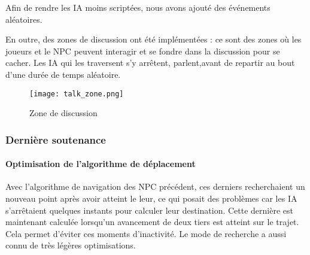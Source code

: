     
        Afin de rendre les IA moins scriptées, nous avons ajouté des événements aléatoires.
        
        En outre, des zones de discussion ont été implémentées : ce sont des zones où les joueurs et le NPC peuvent interagir 
        et se fondre dans la discussion pour se cacher. Les IA qui les traversent s'y arrêtent, parlent,avant de repartir au bout d'une durée 
        de temps aléatoire.

        \begin{figure}[hbt!]
            \centering
            \texttt{[image: talk\_zone.png]}
            \caption{Zone de discussion}
        \end{figure}
        \FloatBarrier


    \vspace{0.5cm}
    \subsubsection{Dernière soutenance}
    \vspace{0.5cm}

        \paragraph{Optimisation de l'algorithme de déplacement}

        Avec l'algorithme de navigation des NPC précédent, ces derniers recherchaient un nouveau point après avoir atteint 
        le leur, ce qui posait des problèmes car les IA s'arrêtaient quelques instants pour calculer leur destination. Cette dernière 
        est maintenant calculée lorsqu'un avancement de deux tiers est atteint sur le trajet. Cela permet d'éviter ces moments 
        d'inactivité. Le mode de recherche a aussi connu de très légères optimisations.